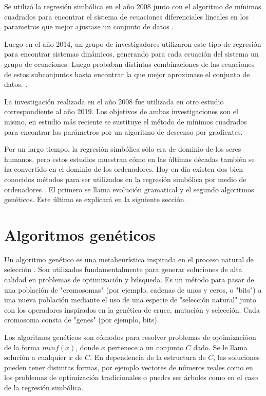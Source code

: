 Se utilizó la regresión simbólica en el año 2008 junto con el algoritmo de mínimos cuadrados para encontrar el sistema de ecuaciones diferenciales lineales en los parametros que mejor ajustase un conjunto de datos \cite{iba2008inference}.

Luego en el año 2014, un grupo de investigadores utilizaron este tipo de regresión para encontrar sistemas dinámicos, generando para cada ecuación del sistema un grupo de ecuaciones. Luego probaban distintas combinaciones de las ecuaciones de estos subconjuntos hasta encontrar la que mejor aproximase el conjunto de datos. \cite{gaucel2014learning}.

La investigación realizada en el año 2008 fue utilizada en otro estudio correspondiente al año 2019. Los objetivos de ambas investigaciones son el mismo, en estudio más reciente se sustituye el método de mínimos cuadrados para encontrar los parámetros por un algoritmo de descenso por gradientes. \cite{kronberger2019identification}

Por un largo tiempo, la regresión simbólica sólo era de dominio de los seres humanos, pero estos estudios muestran cómo en las últimas décadas también se ha convertido en el dominio de los ordenadores. Hoy en día existen dos bien conocidos métodos para ser utilizados en la regresión simbólica por medio de ordenadores \cite{zelinka2005analytic}. El primero se llama evolución gramatical y el segundo algoritmos genéticos. Este último se explicará en la siguiente sección.

\section{Algoritmos genéticos}

Un algoritmo genético es una metaheurística inspirada en el proceso natural de selección \cite{mitchell1998introduction}. Son utilizados fundamentalmente para generar soluciones de alta calidad en problemas de optimización y búsqueda. Es un método para pasar de una población de "cromosomas" (por ejemplo, cadenas de unos y ceros, o "bits") a una nueva población mediante el uso de una especie de "selección natural" junto con los operadores inspirados en la genética de cruce, mutación y selección. Cada cromosoma consta de "genes" (por ejemplo, bits).

Los algoritmos genéticos son cómodos para resolver problemas de optimizacióon de la forma $min f(x)$, donde $x$ pertenece a un conjunto $C$ dado. Se le llama solución a cualquier $x$ de $C$. En dependencia de la estructura de $C$, las soluciones pueden tener distintas formas, por ejemplo vectores de números reales como en los problemas de optimización tradicionales o puedes ser árboles como en el caso de la regresión simbólica.

